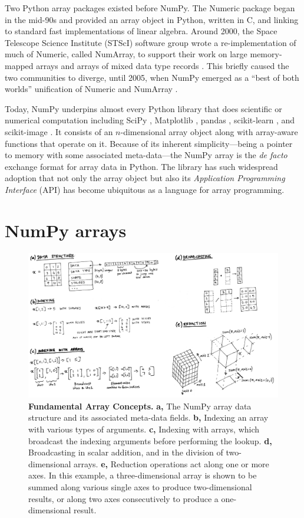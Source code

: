 Two Python array packages existed before NumPy.
The Numeric package began in the mid-90s and provided an array object in
Python, written in C, and linking to standard fast implementations of linear
algebra.
Around 2000, the Space Telescope Science Institute (STScI) software group wrote
a re-implementation of much of Numeric, called NumArray, to support their work
on large memory-mapped arrays and arrays of mixed data type
records \cite{STScI-slither}.
This briefly caused the two communities to diverge, until
2005, when NumPy emerged as a ``best of both worlds'' unification of Numeric
and NumArray \cite{oliphant2006guide}.

Today, NumPy underpins almost every Python library that does scientific or
numerical computation including SciPy \cite{virtanen2019scipy},
Matplotlib \cite{hunter2007matplotlib}, pandas \cite{mckinney-proc-scipy-2010},
scikit-learn \cite{pedregosa2011scikit}, and
scikit-image \cite{vanderwalt2014scikit}.
It consists of an $n$-dimensional array object along with array-aware functions
that operate on it.
Because of its inherent simplicity---being a pointer to memory with some
associated meta-data---the NumPy array is
the {\it de facto} exchange format for array data in Python.
The library has such widespread adoption that not only the array object but also its
{\it Application Programming Interface} (API) has become ubiquitous as
a language for array programming.

\section*{NumPy arrays}

\begin{figure}
  \centering
  \includegraphics[width=.9\textwidth]{static/sketches/array-concepts}   
  \caption{\textbf{Fundamental Array Concepts.}
    \textbf{a,} The NumPy array data structure and its associated meta-data fields.
    \textbf{b,} Indexing an array with various types of arguments.
    \textbf{c,} Indexing with arrays, which broadcast the indexing arguments before performing the lookup.
    \textbf{d,} Broadcasting in scalar addition, and in the division of two-dimensional arrays.
    \textbf{e,} Reduction operations act along one or more axes. In this
    example, a three-dimensional array is shown to be summed along various single
    axes to produce two-dimensional results, or along two axes consecutively to
    produce a one-dimensional result.
   }
  \label{fig:array-concepts}
\end{figure}

